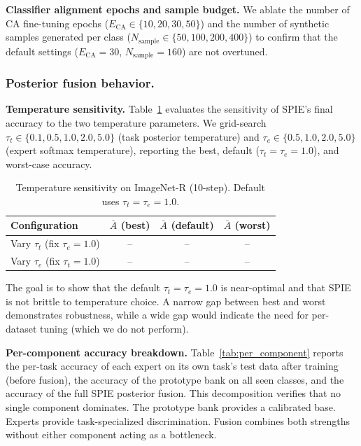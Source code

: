 \textbf{Classifier alignment epochs and sample budget.}
We ablate the number of CA fine-tuning epochs ($E_{\text{CA}} \in \{10, 20, 30, 50\}$) and the number of synthetic samples generated per class ($N_{\text{sample}} \in \{50, 100, 200, 400\}$) to confirm that the default settings ($E_{\text{CA}}=30$, $N_{\text{sample}} = 160$) are not overtuned.

\subsubsection{Posterior fusion behavior.}

\textbf{Temperature sensitivity.}
Table~\ref{tab:temperature} evaluates the sensitivity of SPIE's final accuracy to the two temperature parameters. We grid-search $\tau_t \in \{0.1, 0.5, 1.0, 2.0, 5.0\}$ (task posterior temperature) and $\tau_e \in \{0.5, 1.0, 2.0, 5.0\}$ (expert softmax temperature), reporting the best, default ($\tau_t\!=\!\tau_e\!=\!1.0$), and worst-case accuracy.

\begin{table}[h]
\centering
\caption{Temperature sensitivity on ImageNet-R (10-step). Default uses $\tau_t=\tau_e=1.0$.}
\label{tab:temperature}
\small
\begin{tabular}{lccc}
\toprule
Configuration & $\bar{A}$ (best) & $\bar{A}$ (default) & $\bar{A}$ (worst) \\
\midrule
Vary $\tau_t$ (fix $\tau_e=1.0$) & -- & -- & -- \\
Vary $\tau_e$ (fix $\tau_t=1.0$) & -- & -- & -- \\
\bottomrule
\end{tabular}
\end{table}

The goal is to show that the default $\tau_t=\tau_e=1.0$ is near-optimal and that SPIE is not brittle to temperature choice. A narrow gap between best and worst demonstrates robustness, while a wide gap would indicate the need for per-dataset tuning (which we do not perform).

\textbf{Per-component accuracy breakdown.}
Table~\ref{tab:per_component} reports the per-task accuracy of each expert on its own task's test data after training (before fusion), the accuracy of the prototype bank on all seen classes, and the accuracy of the full SPIE posterior fusion. This decomposition verifies that no single component dominates. The prototype bank provides a calibrated base. Experts provide task-specialized discrimination. Fusion combines both strengths without either component acting as a bottleneck.

